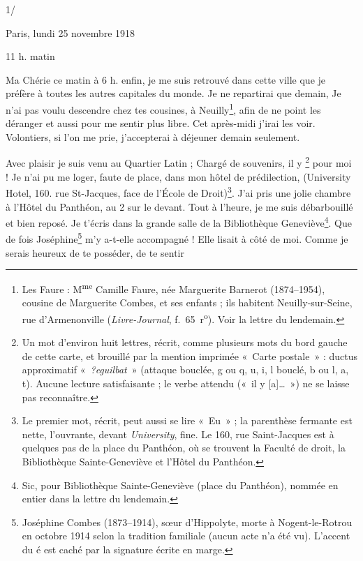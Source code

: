 \begin{LJlettre}
 1/\par\nopagebreak[4]

Paris, lundi 25 novembre 1918

11 h. matin

Ma Chérie ce matin à 6 h. enfin, je me suis retrouvé dans cette ville que je préfère à toutes les autres capitales du monde. Je ne repartirai que demain, Je n'ai pas voulu descendre chez tes cousines, à Neuilly\footnote{\label{n:faure}Les Faure : M\textsuperscript{me} Camille Faure, née Marguerite Barnerot (1874--1954), cousine de Marguerite Combes, et ses enfants ; ils habitent Neuilly-sur-Seine, rue d'Armenonville (\textit{Livre-Journal}, f.~65~r\textsuperscript{o}). Voir la lettre du lendemain.}, afin de ne point les déranger et aussi pour me sentir plus libre. Cet après-midi j'irai les voir. Volontiers, si l'on me prie, j'accepterai à déjeuner demain seulement.

Avec plaisir je suis venu au Quartier Latin ; Chargé de souvenirs, il y \LJill{}\footnote{Un mot d'environ huit lettres, récrit, comme plusieurs mots du bord gauche de cette carte, et brouillé par la mention imprimée «~Carte postale~» : ductus approximatif «~\textit{?eguilbat}~» (attaque bouclée, g ou q, u, i, l bouclé, b ou l, a, t). Aucune lecture satisfaisante ; le verbe attendu («~il y [a]…~») ne se laisse pas reconnaître.} pour moi ! Je n'ai pu me loger, faute de place, dans mon hôtel de prédilection, (University Hotel, 160. rue St-Jacques,  face de l'École de Droit)\footnote{Le premier mot, récrit, peut aussi se lire «~Eu~» ; la parenthèse fermante est nette, l'ouvrante, devant \textit{University}, fine. Le 160, rue Saint-Jacques est à quelques pas de la place du Panthéon, où se trouvent la Faculté de droit, la Bibliothèque Sainte-Geneviève et l'Hôtel du Panthéon.}. J'ai pris une jolie chambre à l'Hôtel du Panthéon, au 2 sur le devant. Tout à l'heure, je me suis débarbouillé et bien reposé. Je t'écris dans la grande salle de la Bibliothèque Geneviève\footnote{Sic, pour Bibliothèque Sainte-Geneviève (place du Panthéon), nommée en entier dans la lettre du lendemain.}. Que de fois Joséphine\footnote{Joséphine Combes (1873--1914), sœur d'Hippolyte, morte à Nogent-le-Rotrou en octobre 1914 selon la tradition familiale (aucun acte n'a été vu). L'accent du é est caché par la signature écrite en marge.} m'y a-t-elle accompagné ! Elle lisait à côté de moi. Comme je serais heureux de te posséder, de te sentir


\end{LJlettre}
